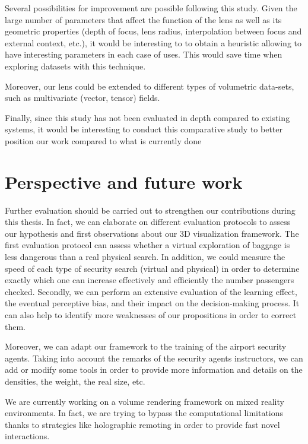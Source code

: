 Several possibilities for improvement are possible following this study. Given the large number of parameters that affect the function of the lens as well as its geometric properties (depth of focus, lens radius, interpolation between focus and external context, etc.), it would be interesting to to obtain a heuristic allowing to have interesting parameters in each case of uses. This would save time when exploring datasets with this technique. 

Moreover, our lens could be extended to different types of volumetric data-sets, such as multivariate (vector, tensor) fields.

Finally, since this study has not been evaluated in depth compared to existing systems, it would be interesting to conduct this comparative study to better position our work compared to what is currently done


\section{Perspective and future work}

Further evaluation should be carried out to strengthen our contributions during this thesis. In fact, we can elaborate on different evaluation protocols to assess our hypothesis and first observations about our 3D visualization framework. The first evaluation protocol can assess whether a virtual exploration of baggage is less dangerous than a real physical search. In addition, we could measure the speed of each type of security search (virtual and physical) in order to determine exactly which one can increase effectively and efficiently the number passengers checked. Secondly, we can perform an extensive evaluation of the learning effect, the eventual perceptive bias, and their impact on the decision-making process.  It can also help to identify more weaknesses of our propositions in order to correct them. 

Moreover, we can adapt our framework to the training of the airport security agents. Taking into account the remarks of the security agents instructors, we can add or modify some tools in order to provide more information and details on the densities, the weight, the real size, etc.  


We are currently working on a  volume rendering framework on mixed reality environments.  In fact, we are trying to bypass the computational limitations thanks to strategies like holographic remoting in order to provide fast novel interactions. 


